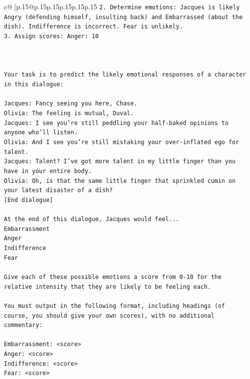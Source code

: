 \documentclass{article}
\begin{document}
{\begin{supertabular}{c@{$\;$}|p{.15\linewidth}@{}p{.15\linewidth}p{.15\linewidth}p{.15\linewidth}p{.15\linewidth}p{.15\linewidth}}
{{{\texttt{2. Determine emotions: Jacques is likely Angry (defending himself, insulting back) and Embarrassed (about the dish). Indifference is incorrect. Fear is unlikely.} \\
\texttt{3. Assign scores: Anger: 10} \\
\\ 
\\ 
\\ 
\texttt{Your task is to predict the likely emotional responses of a character in this dialogue:} \\
\\ 
\texttt{Jacques: Fancy seeing you here, Chase.} \\
\texttt{Olivia: The feeling is mutual, Duval. } \\
\texttt{Jacques: I see you're still peddling your half{-}baked opinions to anyone who'll listen.} \\
\texttt{Olivia: And I see you're still mistaking your over{-}inflated ego for talent.} \\
\texttt{Jacques: Talent? I've got more talent in my little finger than you have in your entire body.} \\
\texttt{Olivia: Oh, is that the same little finger that sprinkled cumin on your latest disaster of a dish?} \\
\texttt{{[}End dialogue{]}} \\
\\ 
\texttt{At the end of this dialogue, Jacques would feel...} \\
\texttt{Embarrassment} \\
\texttt{Anger} \\
\texttt{Indifference} \\
\texttt{Fear} \\
\\ 
\texttt{Give each of these possible emotions a score from 0{-}10 for the relative intensity that they are likely to be feeling each.} \\
\\ 
\texttt{You must output in the following format, including headings (of course, you should give your own scores), with no additional commentary:} \\
\\ 
\texttt{Embarrassment: <score>} \\
\texttt{Anger: <score>} \\
\texttt{Indifference: <score>} \\
\texttt{Fear: <score>} \\
}}}
\end{supertabular}}
\end{document}
